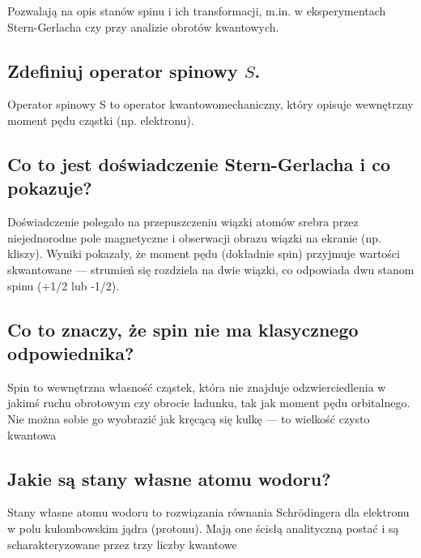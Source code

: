 Pozwalają na opis stanów spinu i ich transformacji, m.in. w eksperymentach Stern-Gerlacha czy przy analizie obrotów kwantowych.

\subsection{Zdefiniuj operator spinowy $S$.}

Operator spinowy S to operator kwantowomechaniczny, który opisuje wewnętrzny moment pędu cząstki (np. elektronu).

\subsection{Co to jest doświadczenie Stern-Gerlacha i co pokazuje?}

Doświadczenie polegało na przepuszczeniu wiązki atomów srebra przez niejednorodne pole magnetyczne i obserwacji obrazu wiązki na ekranie (np. kliszy). Wyniki pokazały, że moment pędu (dokładnie spin) przyjmuje wartości skwantowane — strumień się rozdziela na dwie wiązki, co odpowiada dwu stanom spinu (+1/2 lub -1/2).

\subsection{Co to znaczy, że spin nie ma klasycznego odpowiednika?}

Spin to wewnętrzna własność cząstek, która nie znajduje odzwierciedlenia w jakimś ruchu obrotowym czy obrocie ładunku, tak jak moment pędu orbitalnego. Nie można sobie go wyobrazić jak kręcącą się kulkę — to wielkość czysto kwantowa

\subsection{Jakie są stany własne atomu wodoru?}

Stany własne atomu wodoru to rozwiązania równania Schrödingera dla elektronu w polu kulombowskim jądra (protonu). Mają one ścisłą analityczną postać i są scharakteryzowane przez trzy liczby kwantowe


